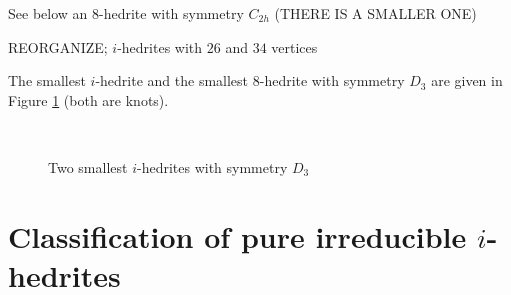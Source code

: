 \documentclass[12pt]{article}
\begin{document}
See below an $8$-hedrite with symmetry $C_{2h}$ (THERE IS A SMALLER ONE)

REORGANIZE; $i$-hedrites with $26$ and $34$ vertices


\begin{center}
\epsfxsize=60mm
\end{center}

\begin{center}
\epsfxsize=60mm
\end{center}



\begin{center}
\epsfxsize=60mm
\end{center}

The smallest $i$-hedrite and the smallest $8$-hedrite with symmetry $D_3$ are given in Figure \ref{fig:WithSymmetryD3} (both are knots).

\begin{figure}
\centering
\mbox{\quad
{}}\caption{Two smallest $i$-hedrites with symmetry $D_3$}
\label{fig:WithSymmetryD3}
\end{figure}








\section{Classification of pure irreducible $i$-hedrites}
\end{document}
